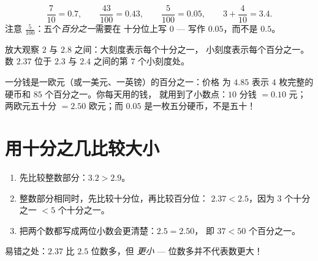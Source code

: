 \begin{example}\label{ex:g4:decimals:convert}
\[
\frac{7}{10} = 0.7, \qquad
\frac{43}{100} = 0.43, \qquad
\frac{5}{100} = 0.05, \qquad
3 + \frac{4}{10} = 3.4 .
\]
注意 $\frac{5}{100}$：五个\emph{百分之一}需要在
十分位上写 $0$ --- 写作 $0.05$，而不是 $0.5$。
\end{example}

\begin{omfigure}

{\small 放大观察 $2$ 与 $2.8$ 之间：大刻度表示每个十分之一，
小刻度表示每个百分之一。数 $2.37$ 位于 $2.3$ 与
$2.4$ 之间的第 $7$ 个小刻度处。}
\end{omfigure}

\begin{example}[钱与百分之一]\label{ex:g4:decimals:money}
一分钱是一欧元（或一美元、一英镑）的百分之一：价格
为 $4.85$ 表示 $4$ 枚完整的硬币和 $85$ 个百分之一。你每天用的钱，
就用到了小数点：$10$ 分钱 $= 0.10$ 元；两欧元五十分
$= 2.50$ 欧元；而 $0.05$ 是一枚五分硬币，不是五十！
\end{example}

\section{用十分之几比较大小}

\begin{method}\label{met:g4:decimals:compare}
\begin{enumerate}
  \item 先比较整数部分：$3.2 > 2.9$。
  \item 整数部分相同时，先比较十分位，再比较百分位：
        $2.37 < 2.5$，因为 $3$ 个十分之一 $< 5$ 个十分之一。
  \item 把两个数都写成两位小数会更清楚：$2.5 = 2.50$，
        即 $37 < 50$ 个百分之一。
\end{enumerate}
易错之处：$2.37$ 比 $2.5$ 位数多，但
\emph{更小} --- 位数多并不代表数更大！
\end{method}

